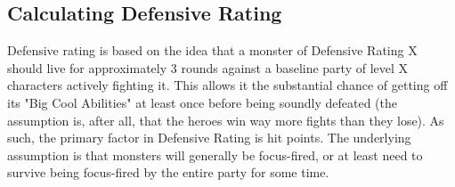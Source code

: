 \subsection{Calculating Defensive Rating}

Defensive rating is based on the idea that a monster of Defensive Rating X should live for approximately 3 rounds against a baseline party of level X characters actively fighting it. This allows it the substantial chance of getting off its "Big Cool Abilities" at least once before being soundly defeated (the assumption is, after all, that the heroes win way more fights than they lose). As such, the primary factor in Defensive Rating is hit points. The underlying assumption is that monsters will generally be focus-fired, or at least need to survive being focus-fired by the entire party for some time.


